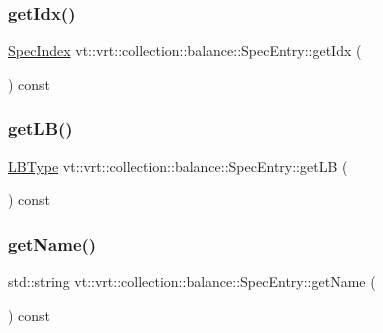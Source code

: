 \subsubsection{\texorpdfstring{get\+Idx()}{getIdx()}}
{\footnotesize\ttfamily \hyperlink{namespacevt_1_1vrt_1_1collection_1_1balance_a72a5e0d9936ddf57f8e6c64e0e9fd123}{Spec\+Index} vt\+::vrt\+::collection\+::balance\+::\+Spec\+Entry\+::get\+Idx (\begin{DoxyParamCaption}{ }\end{DoxyParamCaption}) const\hspace{0.3cm}{\ttfamily [inline]}}

\mbox{\label{structvt_1_1vrt_1_1collection_1_1balance_1_1_spec_entry_a265df7d1bc8ac20e92c7799fd4973018}} 
\subsubsection{\texorpdfstring{get\+L\+B()}{getLB()}}
{\footnotesize\ttfamily \hyperlink{namespacevt_1_1vrt_1_1collection_1_1balance_ac4f99693509affcc67db182d4aad9b5c}{L\+B\+Type} vt\+::vrt\+::collection\+::balance\+::\+Spec\+Entry\+::get\+LB (\begin{DoxyParamCaption}{ }\end{DoxyParamCaption}) const\hspace{0.3cm}{\ttfamily [inline]}}

\mbox{\label{structvt_1_1vrt_1_1collection_1_1balance_1_1_spec_entry_a1a6b18669456c0d4c9c311c63fd912c8}} 
\subsubsection{\texorpdfstring{get\+Name()}{getName()}}
{\footnotesize\ttfamily std\+::string vt\+::vrt\+::collection\+::balance\+::\+Spec\+Entry\+::get\+Name (\begin{DoxyParamCaption}{ }\end{DoxyParamCaption}) const\hspace{0.3cm}{\ttfamily [inline]}}

